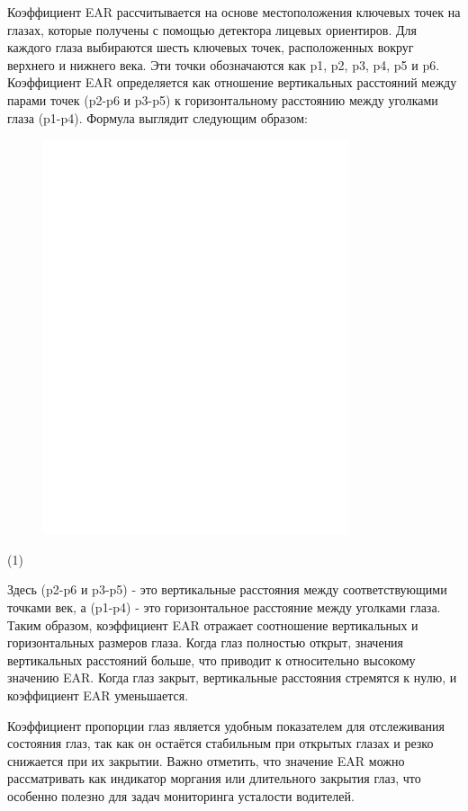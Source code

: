 Коэффициент EAR рассчитывается на основе местоположения ключевых точек
на глазах, которые получены с помощью детектора лицевых ориентиров. Для
каждого глаза выбираются шесть ключевых точек, расположенных вокруг
верхнего и нижнего века. Эти точки обозначаются как p1, p2, p3, p4, p5 и
p6. Коэффициент EAR определяется как отношение вертикальных расстояний
между парами точек (p2-p6 и p3-p5) к горизонтальному расстоянию между
уголками глаза (p1-p4). Формула выглядит следующим образом:

\begin{figure}[H]
	\centering
	\includegraphics[width=0.8\textwidth]{media/ict/image13}
	\caption*{}
\end{figure}

(1)

Здесь (p2-p6 и p3-p5) - это вертикальные расстояния между
соответствующими точками век, а (p1-p4) - это горизонтальное расстояние
между уголками глаза. Таким образом, коэффициент EAR отражает
соотношение вертикальных и горизонтальных размеров глаза. Когда глаз
полностью открыт, значения вертикальных расстояний больше, что приводит
к относительно высокому значению EAR. Когда глаз закрыт, вертикальные
расстояния стремятся к нулю, и коэффициент EAR уменьшается.

Коэффициент пропорции глаз является удобным показателем для отслеживания
состояния глаз, так как он остаётся стабильным при открытых глазах и
резко снижается при их закрытии. Важно отметить, что значение EAR можно
рассматривать как индикатор моргания или длительного закрытия глаз, что
особенно полезно для задач мониторинга усталости водителей.


